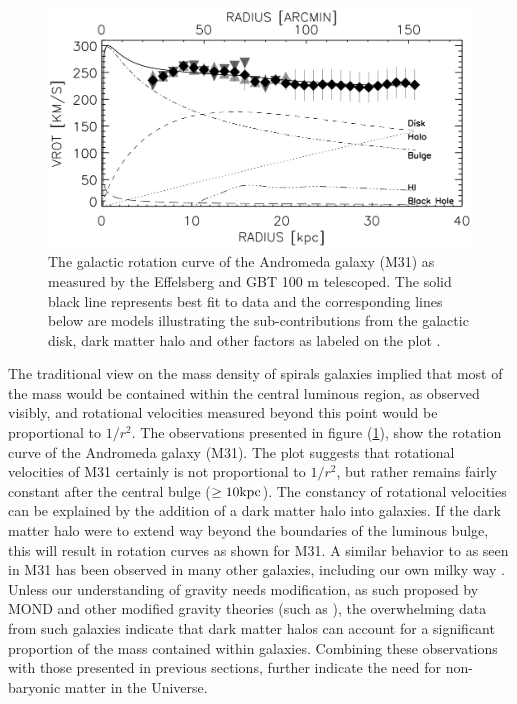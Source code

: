 \begin{figure}[ht!]
    \begin{center}
        \includegraphics[scale=0.35]{Chapter_1/Figures/Rotation_curve_M31.jpg}
        \caption[Observed rotation curve and corresponding mass models for the Andromeda galaxy (M31) by using data from the Effelsberg and GBT 100 m observations.]%
        {The galactic rotation curve of the Andromeda galaxy (M31) as measured by the Effelsberg and GBT 100 m telescoped. The solid black line represents best fit to data and the corresponding lines below are models illustrating the sub-contributions from the galactic disk, dark matter halo and other factors as labeled on the plot \cite{Carignan_2006}.}
        \label{fig:rotation_m31}
        \end{center}
\end{figure}

The traditional view on the mass density of spirals galaxies implied that most of the mass would be contained within the central luminous region, as observed visibly, and rotational velocities measured beyond this point would be proportional to $1/r^2$. The observations presented in figure (\ref{fig:rotation_m31}), show the rotation curve of the Andromeda galaxy (M31). The plot suggests that rotational velocities of M31 certainly is not proportional to $1/r^2$, but rather remains fairly constant after the central bulge ($\geq 10 \text{kpc}$). The constancy of rotational velocities can be explained by the addition of a dark matter halo into galaxies. If the dark matter halo were to extend way beyond the boundaries of the luminous bulge, this will result in rotation curves as shown for M31. A similar behavior to as seen in M31 has been observed in many other galaxies, including our own milky way \cite{Carignan_2006, Mr_z_2019}. Unless our understanding of gravity needs modification, as such proposed by MOND and other modified gravity theories (such as \cite{Milgrom_2015, Moffat_2006}), the overwhelming data from such galaxies indicate that dark matter halos can account for a significant proportion of the mass contained within galaxies. Combining these observations with those presented in previous sections, further indicate the need for non-baryonic matter in the Universe.


